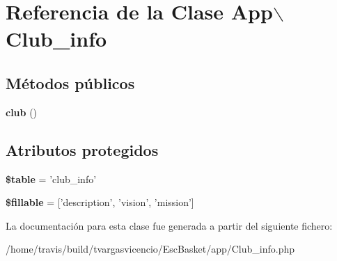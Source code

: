 \hypertarget{class_app_1_1_club__info}{\section{\-Referencia de la \-Clase \-App$\backslash$\-Club\-\_\-info}
\label{class_app_1_1_club__info}
}
\subsection*{\-Métodos públicos}
\begin{DoxyCompactItemize}
\item 
\hypertarget{class_app_1_1_club__info_af83cda2365b0deaa6e0b09988d166e45}{{\bfseries club} ()}\label{class_app_1_1_club__info_af83cda2365b0deaa6e0b09988d166e45}

\end{DoxyCompactItemize}
\subsection*{\-Atributos protegidos}
\begin{DoxyCompactItemize}
\item 
\hypertarget{class_app_1_1_club__info_ad34633ca3fe971fe8078d2e37cfee26f}{{\bfseries \$table} = 'club\-\_\-info'}\label{class_app_1_1_club__info_ad34633ca3fe971fe8078d2e37cfee26f}

\item 
\hypertarget{class_app_1_1_club__info_a6182d58bc178ae1b8e08512900635c5f}{{\bfseries \$fillable} = \mbox{[}'description', 'vision', 'mission'\mbox{]}}\label{class_app_1_1_club__info_a6182d58bc178ae1b8e08512900635c5f}

\end{DoxyCompactItemize}


\-La documentación para esta clase fue generada a partir del siguiente fichero\-:\begin{DoxyCompactItemize}
\item 
/home/travis/build/tvargasvicencio/\-Esc\-Basket/app/\-Club\-\_\-info.\-php\end{DoxyCompactItemize}
